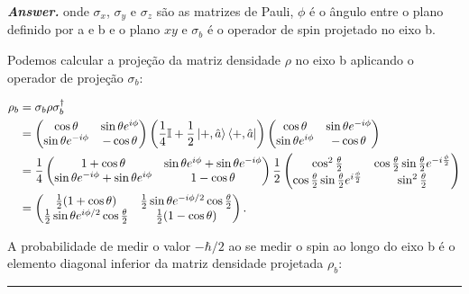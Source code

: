 \documentclass[12pt]{article}
\newenvironment{answer}{\noindent\textbf{\textit{Answer.}} \normalfont }{\par\noindent\rule{\textwidth}{0.4pt}}
\begin{document}
\begin{answer}
		onde $\sigma_x$, $\sigma_y$ e $\sigma_z$ são as matrizes de Pauli, $\phi$ é o ângulo entre o plano definido por a e b e o plano $xy$ e $\sigma_b$ é o operador de spin projetado no eixo b.
		
		Podemos calcular a projeção da matriz densidade $\rho$ no eixo b aplicando o operador de projeção $\sigma_b$:
		
		\begin{align*}
			\rho_b &= \sigma_b \rho \sigma_b^\dagger \\
			&= \begin{pmatrix}
				\cos\theta & \sin\theta e^{i\phi} \\
				\sin\theta e^{-i\phi} & -\cos\theta
			\end{pmatrix}
			\left(\frac{1}{4}\mathbb{I} + \frac{1}{2}\ket{+, \hat{a}}\bra{+, \hat{a}}\right)
			\begin{pmatrix}
				\cos\theta & \sin\theta e^{-i\phi} \\
				\sin\theta e^{i\phi} & -\cos\theta
			\end{pmatrix} \\
			&= \frac{1}{4}\begin{pmatrix}
				1+\cos\theta & \sin\theta e^{i\phi}+\sin\theta e^{-i\phi} \\
				\sin\theta e^{-i\phi}+\sin\theta e^{i\phi} & 1-\cos\theta
			\end{pmatrix}
			\frac{1}{2}\begin{pmatrix}
				\cos^2\frac{\theta}{2} & \cos\frac{\theta}{2}\sin\frac{\theta}{2}e^{-i\frac{\phi}{2}} \\
				\cos\frac{\theta}{2}\sin\frac{\theta}{2}e^{i\frac{\phi}{2}} & \sin^2\frac{\theta}{2}
			\end{pmatrix} \\
			&= \begin{pmatrix}
				\frac{1}{2}(1+\cos\theta) & \frac{1}{2}\sin\theta e^{-i\phi/2}\cos\frac{\theta}{2} \\
				\frac{1}{2}\sin\theta e^{i\phi/2}\cos\frac{\theta}{2} & \frac{1}{2}(1-\cos\theta)
			\end{pmatrix}.
		\end{align*}
		
		A probabilidade de medir o valor $-\hbar/2$ ao se medir o spin ao longo do eixo b é o elemento diagonal inferior da matriz densidade projetada $\rho_b$:
	\end{answer}
\end{document}
